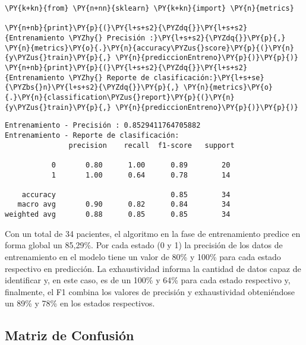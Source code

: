     \begin{tcolorbox}[breakable, size=fbox, boxrule=1pt, pad at break*=1mm,colback=cellbackground, colframe=cellborder]
\begin{Verbatim}[commandchars=\\\{\}]
\PY{k+kn}{from} \PY{n+nn}{sklearn} \PY{k+kn}{import} \PY{n}{metrics}

\PY{n+nb}{print}\PY{p}{(}\PY{l+s+s2}{\PYZdq{}}\PY{l+s+s2}{Entrenamiento \PYZhy{} Precisión :}\PY{l+s+s2}{\PYZdq{}}\PY{p}{,} \PY{n}{metrics}\PY{o}{.}\PY{n}{accuracy\PYZus{}score}\PY{p}{(}\PY{n}{y\PYZus{}train}\PY{p}{,} \PY{n}{prediccionEntreno}\PY{p}{)}\PY{p}{)}
\PY{n+nb}{print}\PY{p}{(}\PY{l+s+s2}{\PYZdq{}}\PY{l+s+s2}{Entrenamiento \PYZhy{} Reporte de clasificación:}\PY{l+s+se}{\PYZbs{}n}\PY{l+s+s2}{\PYZdq{}}\PY{p}{,} \PY{n}{metrics}\PY{o}{.}\PY{n}{classification\PYZus{}report}\PY{p}{(}\PY{n}{y\PYZus{}train}\PY{p}{,} \PY{n}{prediccionEntreno}\PY{p}{)}\PY{p}{)}
\end{Verbatim}
\end{tcolorbox}

    \begin{Verbatim}[commandchars=\\\{\}]
Entrenamiento - Precisión : 0.8529411764705882
Entrenamiento - Reporte de clasificación:
               precision    recall  f1-score   support

           0       0.80      1.00      0.89        20
           1       1.00      0.64      0.78        14

    accuracy                           0.85        34
   macro avg       0.90      0.82      0.84        34
weighted avg       0.88      0.85      0.85        34

    \end{Verbatim}

    Con un total de 34 pacientes, el algoritmo en la fase de entrenamiento predice en forma global un 85,29\%. Por cada estado (0 y 1) la precisión de los datos de entrenamiento en el modelo tiene un valor de 80\%  y 100\% para cada estado respectivo en predicción. La exhaustividad informa la cantidad de datos capaz de identificar y, en este caso, es de un 100\% y 64\% para cada estado respectivo y, finalmente, el F1 combina los valores de precisión y exhaustividad obteniéndose un 89\% y 78\% en los estados respectivos. 

    \hypertarget{matriz-de-confusiuxf3n}{%
\subsection{Matriz de Confusión}\label{matriz-de-confusiuxf3n}}

